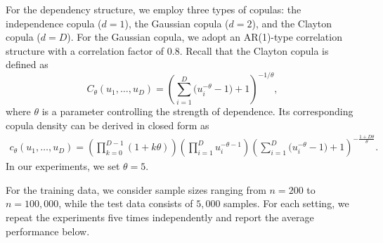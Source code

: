 \documentclass[twoside,11pt]{article}
\newcommand{\bean}{\setlength\arraycolsep{1pt}\begin{eqnarray*}}
\newcommand{\eean}{\end{eqnarray*}}
\begin{document}



For the dependency structure, we employ three types of copulas: the independence copula ($d = 1$), the Gaussian copula ($d = 2$), and the Clayton copula ($d = D$). For the Gaussian copula, we adopt an AR(1)-type correlation structure with a correlation factor of $0.8$. Recall that the Clayton copula is defined as
\begin{equation*}
C_{\theta}(u_1, \ldots, u_D)
= \left( \sum_{i=1}^D \bigl(u_i^{-\theta} - 1 \bigr) + 1 \right)^{-1/\theta},    
\end{equation*}
where $\theta$ is a parameter controlling the strength of dependence.
Its corresponding copula density can be derived in closed form as
\bean
c_{\theta} (u_1,\ldots,u_{D}) = \left( \prod_{k=0}^{D-1} \left(1 + k \theta \right) \right) \left( \prod_{i=1}^{D} u_{i}^{-\theta-1} \right)  \left( \sum_{i=1}^D \bigl(u_i^{-\theta} - 1 \bigr) + 1 \right)^{-\frac{1+D\theta}{\theta}}.
\eean
In our experiments, we set $\theta = 5$.



For the training data, we consider sample sizes ranging from $n = 200$ to $n = 100{,}000$, while the test data consists of $5{,}000$ samples. For each setting, we repeat the experiments five times independently and report the average performance below.
\end{document}
